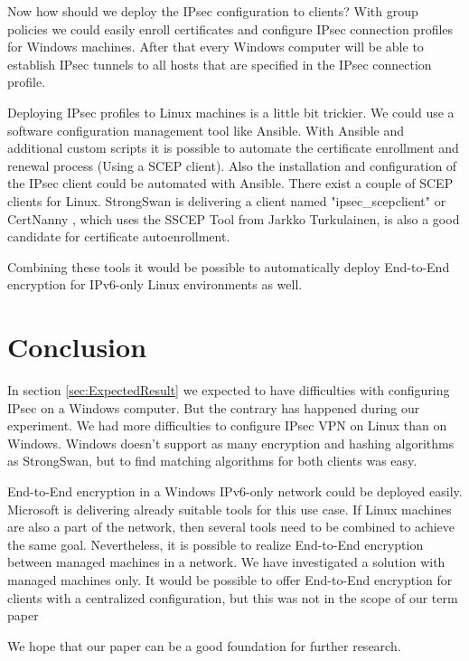 \documentclass[a4paper]{report}
\begin{document}
Now how should we deploy the IPsec configuration to clients? With group policies we could easily enroll certificates and configure IPsec connection profiles for Windows machines. 
After that every Windows computer will be able to establish IPsec tunnels to all hosts that are specified in the IPsec connection profile.

Deploying IPsec profiles to Linux machines is a little bit trickier. We could use a software configuration management tool like Ansible. 
With Ansible and additional custom scripts it is possible to automate the certificate enrollment and renewal process (Using a SCEP client).
Also the installation and configuration of the IPsec client could be automated with Ansible. 
There exist a couple of SCEP clients for Linux. StrongSwan is delivering a client named "ipsec\_scepclient" \parencite{Hutter2005} or CertNanny \parencite{Bartosch2017}, 
which uses the SSCEP Tool from Jarkko Turkulainen, is also a good candidate for certificate autoenrollment.

Combining these tools it would be possible to automatically deploy End-to-End encryption for IPv6-only Linux environments as well.

\section{Conclusion}
\label{sec:Conc}
In section \ref{sec:ExpectedResult} we expected to have difficulties with configuring IPsec on a Windows computer. But the contrary has happened during our experiment. 
We had more difficulties to configure IPsec VPN on Linux than on Windows. Windows doesn't support as many encryption and hashing algorithms as StrongSwan, but to find matching algorithms for both clients was easy.

End-to-End encryption in a Windows IPv6-only network could be deployed easily. Microsoft is delivering already suitable tools for this use case. 
If Linux machines are also a part of the network, then several tools need to be combined to achieve the same goal. Nevertheless, it is possible to realize End-to-End encryption between managed machines in a network. 
We have investigated a solution with managed machines only. It would be possible to offer End-to-End encryption for clients with a centralized configuration, but this was not in the scope of our term paper

We hope that our paper can be a good foundation for further research. 

\appendix
\end{document}

